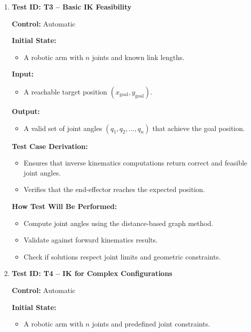 \documentclass[12pt, titlepage]{article}
\begin{document}
\begin{enumerate}

\item \textbf{Test ID: T3 -- Basic IK Feasibility}  

\textbf{Control:} Automatic  

\textbf{Initial State:}  
\begin{itemize}
    \item A robotic arm with \( n \) joints and known link lengths.
\end{itemize}

\textbf{Input:}  
\begin{itemize}
    \item A reachable target position \( (x_{\text{goal}}, y_{\text{goal}}) \).
\end{itemize}

\textbf{Output:}  
\begin{itemize}
    \item A valid set of joint angles \( (q_1, q_2, ..., q_n) \) that achieve the goal position.
\end{itemize}

\textbf{Test Case Derivation:}  
\begin{itemize}
    \item Ensures that inverse kinematics computations return correct and feasible joint angles.
    \item Verifies that the end-effector reaches the expected position.
\end{itemize}

\textbf{How Test Will Be Performed:}  
\begin{itemize}
    \item Compute joint angles using the distance-based graph method.
    \item Validate against forward kinematics results.
    \item Check if solutions respect joint limits and geometric constraints.
\end{itemize}

\item \textbf{Test ID: T4 -- IK for Complex Configurations}  

\textbf{Control:} Automatic  

\textbf{Initial State:}  
\begin{itemize}
    \item A robotic arm with \( n \) joints and predefined joint constraints.
\end{itemize}


\end{enumerate}
\end{document}
